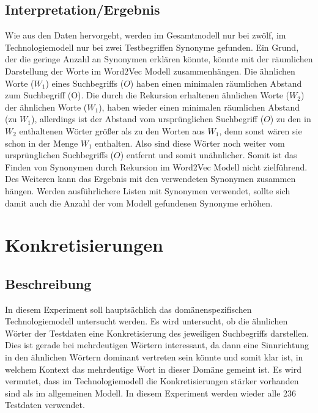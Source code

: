 \documentclass[12pt,a4paper]{report}
\begin{document}
		\subsection*{Interpretation/Ergebnis}
		Wie aus den Daten hervorgeht, werden im Gesamtmodell nur bei zwölf, im Technologiemodell nur bei zwei Testbegriffen Synonyme gefunden.
		Ein Grund, der die geringe Anzahl an Synonymen erklären könnte, könnte mit der räumlichen Darstellung der Worte im Word2Vec Modell zusammenhängen. Die ähnlichen Worte ($W_1$) eines Suchbegriffs ($O$) haben einen minimalen räumlichen Abstand zum Suchbegriff (O). 
		Die durch die Rekursion erhaltenen ähnlichen Worte ($W_2$) der ähnlichen Worte ($W_1$), haben wieder einen minimalen räumlichen Abstand (zu $W_1$), allerdings ist der Abstand vom ursprünglichen Suchbegriff ($O$) zu den in $W_2$ enthaltenen Wörter größer als zu den Worten aus $W_1$, denn sonst wären sie schon in der Menge $W_1$ enthalten. Also sind diese Wörter noch weiter vom ursprünglichen Suchbegriffs ($O$) entfernt und somit unähnlicher. Somit ist das Finden von Synonymen durch Rekursion im Word2Vec Modell nicht zielführend.\\
		Des Weiteren kann das Ergebnis mit den verwendeten Synonymen zusammen hängen. Werden ausführlichere Listen mit Synonymen verwendet, sollte sich damit auch die Anzahl der vom Modell gefundenen Synonyme erhöhen.\\
		
		
	
	\section{Konkretisierungen}
		\subsection*{Beschreibung}
		In diesem Experiment soll hauptsächlich das domänenspezifischen Technologiemodell untersucht werden. Es wird untersucht, ob die ähnlichen Wörter der Testdaten eine Konkretisierung des jeweiligen Suchbegriffs darstellen.	Dies ist gerade bei mehrdeutigen Wörtern interessant, da dann eine Sinnrichtung in den ähnlichen Wörtern dominant vertreten sein könnte und somit klar ist, in welchem Kontext das mehrdeutige Wort in dieser Domäne gemeint ist. Es wird vermutet, dass im Technologiemodell die Konkretisierungen stärker vorhanden sind als im allgemeinen Modell. In diesem Experiment werden wieder alle 236 Testdaten verwendet.\\
		
\end{document}
